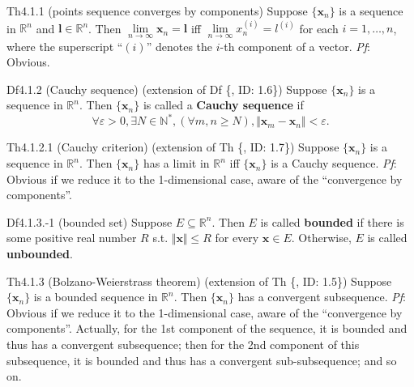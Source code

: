 \documentclass{article}
\begin{document}
\begin{Th}{Th4.1.1 (points sequence converges by components)}
    Suppose $\{\pmb{x}_n\}$ is a sequence in $\mathbb{R}^n$ and $\pmb{l}\in\mathbb{R}^n$. Then $\lim\limits_{n\to\infty} \pmb{x}_n = \pmb{l}$ iff $\lim\limits_{n\to\infty} x^{(i)}_n = l^{(i)}$ for each $i = 1, \dots, n$, where the superscript ``$(i)$'' denotes the $i$-th component of a vector.
    \tcblower
    \textit{Pf}: Obvious.
\end{Th}

\begin{Df}{Df4.1.2 (Cauchy sequence) (extension of Df \{, ID: 1.6\})}
    Suppose $\{\pmb{x}_n\}$ is a sequence in $\mathbb{R}^n$. Then $\{\pmb{x}_n\}$ is called a \textbf{Cauchy sequence} if
    $$\forall \varepsilon > 0, \exists N\in\mathbb{N}^\ast, \left(\forall m,n\geq N\right), \Vert \pmb{x}_m - \pmb{x}_n\Vert < \varepsilon.$$
\end{Df}

\begin{Th}{Th4.1.2.1 (Cauchy criterion) (extension of Th \{, ID: 1.7\})}
    Suppose $\{\pmb{x}_n\}$ is a sequence in $\mathbb{R}^n$. Then $\{\pmb{x}_n\}$ has a limit in $\mathbb{R}^n$ iff $\{\pmb{x}_n\}$ is a Cauchy sequence.
    \tcblower
    \textit{Pf}: Obvious if we reduce it to the 1-dimensional case, aware of the ``convergence by components''.
\end{Th}

\begin{Df}{Df4.1.3.-1 (bounded set)}
    Suppose $E\subseteq\mathbb{R}^n$. Then $E$ is called \textbf{bounded} if there is some positive real number $R$ s.t. $\Vert\pmb{x}\Vert\leq R$ for every $\pmb{x}\in E$. Otherwise, $E$ is called \textbf{unbounded}.
\end{Df}

\begin{Th}{Th4.1.3 (Bolzano-Weierstrass theorem) (extension of Th \{, ID: 1.5\})}
    Suppose $\{\pmb{x}_n\}$ is a bounded sequence in $\mathbb{R}^n$. Then $\{\pmb{x}_n\}$ has a convergent subsequence.
    \tcblower
    \textit{Pf}: Obvious if we reduce it to the 1-dimensional case, aware of the ``convergence by components''. Actually, for the 1st component of the sequence, it is bounded and thus has a convergent subsequence; then for the 2nd component of this subsequence, it is bounded and thus has a convergent sub-subsequence; and so on.
\end{Th}
\end{document}
